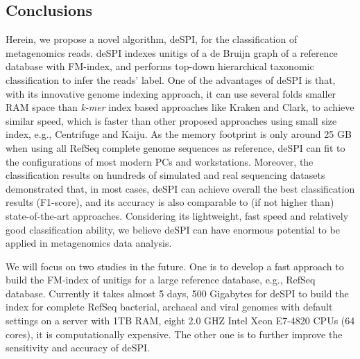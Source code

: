 \documentclass[a0,portrait, svgnames]{a0poster}
\begin{document}
\begin{multicols}{2}
\section*{Conclusions}
Herein, we propose a novel algorithm, deSPI, for the classification of metagenomics reads. deSPI indexes unitigs of a de Bruijn graph of a reference database with FM-index, and performs top-down hierarchical taxonomic classification to infer the reads' label. One of the advantages of deSPI is that, with its innovative genome indexing approach, it can use several folds smaller RAM space than \textit{k-mer} index based approaches like Kraken and Clark, to achieve similar speed, which is faster than other proposed approaches using small size index, e.g., Centrifuge and Kaiju. As the memory footprint is only around 25 GB when using all RefSeq complete genome sequences as reference, deSPI can fit to the configurations of most modern PCs and workstations. Moreover, the classification results on hundreds of simulated and real sequencing datasets demonstrated that, in most cases, deSPI can achieve overall the best classification results (F1-score), and its accuracy is also comparable to (if not higher than) state-of-the-art approaches. Considering its lightweight, fast speed and relatively good classification ability, we believe deSPI can have enormous potential to be applied in metagenomics data analysis. 

We will focus on two studies in the future. One is to develop a fast approach to build the FM-index of unitigs for a large reference database, e.g., RefSeq database. Currently it takes almost 5 days, 500 Gigabytes for deSPI to build the index for complete RefSeq bacterial, archaeal and viral genomes with default settings on a server with 1TB RAM, eight 2.0 GHZ Intel Xeon E7-4820 CPUs (64 cores), it is computationally expensive.  The other one is to further improve the sensitivity and accuracy of deSPI. 



\end{multicols}
\end{document}
